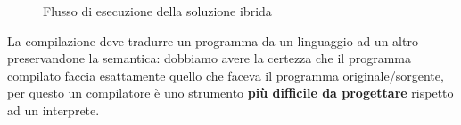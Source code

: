 \documentclass[12pt,a4paper]{article}
\begin{document}
\begin{figure}[h!]
	\begin{center}
	  \caption{Flusso di esecuzione della soluzione ibrida}
	\end{center}
\end{figure}

\clearpage

La compilazione deve tradurre un programma da un linguaggio ad un altro preservandone la semantica: dobbiamo avere la certezza che il programma compilato faccia esattamente quello che faceva il programma originale\slash sorgente, per questo un compilatore è uno strumento \textbf{più difficile da progettare} rispetto ad un interprete.
\end{document}
